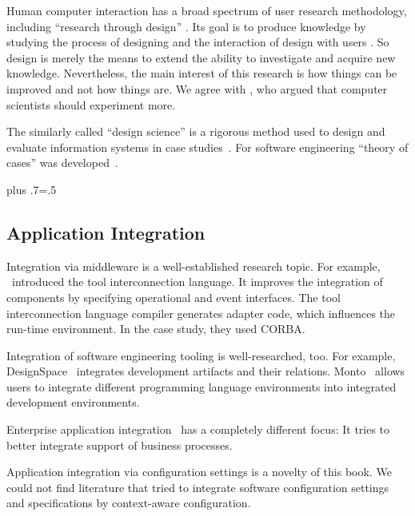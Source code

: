 Human computer interaction has a broad spectrum of user research methodology, including ``research through design'' \cite{gaver2012expect}.
Its goal is to produce knowledge by studying the process of designing and the interaction of design with users \cite{storni2015personal}.
So design is merely the means to extend the ability to investigate and acquire new knowledge.
Nevertheless, the main interest of this research is how things can be improved and not how things are.
We agree with \citet{tichy1997should}, who argued that computer scientists should experiment more.

The similarly called ``design science'' is a rigorous method used to design and evaluate information systems in case studies~\cite{wieringa2009design}.
For software engineering ``theory of cases'' was developed~\cite{eisenhardt2007theory,easterbrook2008selecting}.%
{\parfillskip=0pt plus .7\textwidth \emergencystretch=.5\textwidth \par}




\subsection{Application Integration}

Integration via middleware is a well-established research topic.
For example, \citet{paul1997integration}~introduced the tool interconnection language.
It improves the integration of components by specifying operational and event interfaces.
The tool interconnection language compiler generates adapter code, which influences the run-time environment.
In the case study, they used CORBA.

Integration of software engineering tooling is well-researched, too.
For example, DesignSpace~\cite{demuth2015designspace} integrates development artifacts and their relations.
Monto~\cite{keidel2016ide} allows users to integrate different programming language environments into integrated development environments.

Enterprise application integration~\cite{conrad2005enterprise} has a completely different focus:
It tries to better integrate support of business processes.

Application integration via configuration settings is a novelty of this book.
We could not find literature that tried to integrate software configuration settings and specifications by context-aware configuration.
